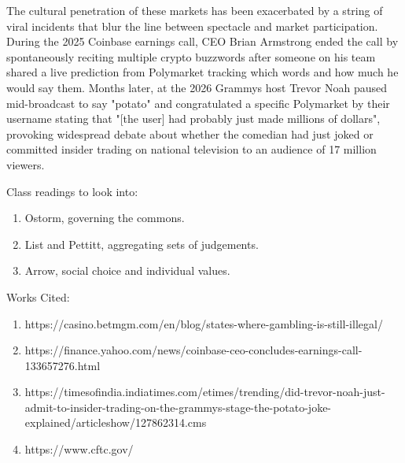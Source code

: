 \documentclass[12pt]{article}
\begin{document}
The cultural penetration of these markets has been exacerbated by a string of viral incidents that blur the line between spectacle and market participation. During the 2025 Coinbase earnings call, CEO Brian Armstrong ended the call by spontaneously reciting multiple crypto buzzwords after someone on his team shared a live prediction from Polymarket tracking which words and how much he would say them. Months later, at the 2026 Grammys host Trevor Noah paused mid-broadcast to say "potato" and congratulated a specific Polymarket by their username stating that "[the user] had probably just made millions of dollars", provoking widespread debate about whether the comedian had just joked or committed insider trading on national television to an audience of 17 million viewers.

\newpage
Class readings to look into:
\begin{enumerate}
    \item Ostorm, governing the commons.
    \item List and Pettitt, aggregating sets of judgements.
    \item Arrow, social choice and individual values.
\end{enumerate}

\newpage
\begin{center}
    Works Cited:
    \begin{enumerate}
        \item https://casino.betmgm.com/en/blog/states-where-gambling-is-still-illegal/
        \item https://finance.yahoo.com/news/coinbase-ceo-concludes-earnings-call-133657276.html
        \item https://timesofindia.indiatimes.com/etimes/trending/did-trevor-noah-just-admit-to-insider-trading-on-the-grammys-stage-the-potato-joke-explained/articleshow/127862314.cms
        \item https://www.cftc.gov/
    \end{enumerate}
\end{center}
\end{document}
